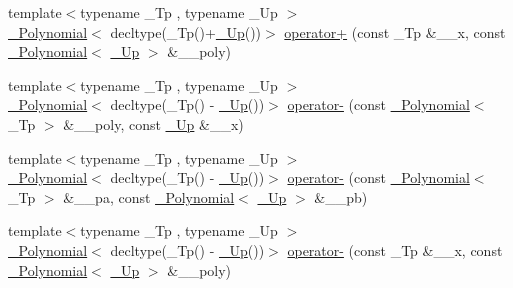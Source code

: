 \begin{DoxyCompactItemize}
\item 
{\footnotesize template$<$typename \+\_\+\+Tp , typename \+\_\+\+Up $>$ }\\\hyperlink{class____gnu__cxx_1_1__Polynomial}{\+\_\+\+Polynomial}$<$ decltype(\+\_\+\+Tp()+\hyperlink{namespace____gnu__cxx_ab693ea357b6429b331e0bf09f9442385}{\+\_\+\+Up}())$>$ \hyperlink{namespace____gnu__cxx_ac9f58ced995b65628b5715c885569cb7}{operator+} (const \+\_\+\+Tp \&\+\_\+\+\_\+x, const \hyperlink{class____gnu__cxx_1_1__Polynomial}{\+\_\+\+Polynomial}$<$ \hyperlink{namespace____gnu__cxx_ab693ea357b6429b331e0bf09f9442385}{\+\_\+\+Up} $>$ \&\+\_\+\+\_\+poly)
\item 
{\footnotesize template$<$typename \+\_\+\+Tp , typename \+\_\+\+Up $>$ }\\\hyperlink{class____gnu__cxx_1_1__Polynomial}{\+\_\+\+Polynomial}$<$ decltype(\+\_\+\+Tp() -\/ \hyperlink{namespace____gnu__cxx_ab693ea357b6429b331e0bf09f9442385}{\+\_\+\+Up}())$>$ \hyperlink{namespace____gnu__cxx_abc583ac0684f0aff079c6014f3d84c1d}{operator-\/} (const \hyperlink{class____gnu__cxx_1_1__Polynomial}{\+\_\+\+Polynomial}$<$ \+\_\+\+Tp $>$ \&\+\_\+\+\_\+poly, const \hyperlink{namespace____gnu__cxx_ab693ea357b6429b331e0bf09f9442385}{\+\_\+\+Up} \&\+\_\+\+\_\+x)
\item 
{\footnotesize template$<$typename \+\_\+\+Tp , typename \+\_\+\+Up $>$ }\\\hyperlink{class____gnu__cxx_1_1__Polynomial}{\+\_\+\+Polynomial}$<$ decltype(\+\_\+\+Tp() -\/ \hyperlink{namespace____gnu__cxx_ab693ea357b6429b331e0bf09f9442385}{\+\_\+\+Up}())$>$ \hyperlink{namespace____gnu__cxx_a4609eee7a71e3be3a103df9556fab9b4}{operator-\/} (const \hyperlink{class____gnu__cxx_1_1__Polynomial}{\+\_\+\+Polynomial}$<$ \+\_\+\+Tp $>$ \&\+\_\+\+\_\+pa, const \hyperlink{class____gnu__cxx_1_1__Polynomial}{\+\_\+\+Polynomial}$<$ \hyperlink{namespace____gnu__cxx_ab693ea357b6429b331e0bf09f9442385}{\+\_\+\+Up} $>$ \&\+\_\+\+\_\+pb)
\item 
{\footnotesize template$<$typename \+\_\+\+Tp , typename \+\_\+\+Up $>$ }\\\hyperlink{class____gnu__cxx_1_1__Polynomial}{\+\_\+\+Polynomial}$<$ decltype(\+\_\+\+Tp() -\/ \hyperlink{namespace____gnu__cxx_ab693ea357b6429b331e0bf09f9442385}{\+\_\+\+Up}())$>$ \hyperlink{namespace____gnu__cxx_acc72fd3c1efcf09698d30d42c4a1eb1b}{operator-\/} (const \+\_\+\+Tp \&\+\_\+\+\_\+x, const \hyperlink{class____gnu__cxx_1_1__Polynomial}{\+\_\+\+Polynomial}$<$ \hyperlink{namespace____gnu__cxx_ab693ea357b6429b331e0bf09f9442385}{\+\_\+\+Up} $>$ \&\+\_\+\+\_\+poly)

\end{DoxyCompactItemize}

